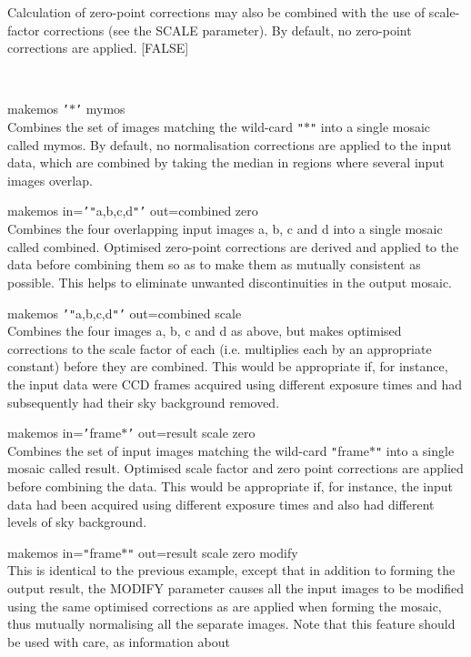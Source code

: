 \documentclass[twoside,11pt]{article}
\renewcommand{\_}{\texttt{\symbol{95}}}
\newcommand{\qt}[1]{{\tt "}#1{\tt "}}
\newcommand{\qs}[1]{{\tt '}#1{\tt '}}
\newcommand{\sstexamples}[1]{
   \item[Examples:] \mbox{} \\
   \vspace{-3.5ex}
   \begin{description}
      #1
   \end{description}
}
\newcommand{\sstexamplesubsection}[2]{\sloppy \item{\ssttt #1} \mbox{} \\ #2 }
\newcommand{\sstexamples}[1]{
      \item[Examples:] \\
      \begin{description}
         #1
      \end{description}
      \\
   }
\newcommand{\sstexamplesubsection}[2]{\item[{\ssttt #1}] #2}
\begin{document}
{{{         Calculation of zero-point corrections may also be combined
         with the use of scale-factor corrections (see the SCALE
         parameter). By default, no zero-point corrections are applied.
         [FALSE]
      }
   }
   \sstexamples{
      \sstexamplesubsection{
         makemos \qs{$*$} mymos
      } {
         Combines the set of images matching the wild-card \qt{$*$} into a
         single mosaic called mymos. By default, no normalisation
         corrections are applied to the input data, which are combined
         by taking the median in regions where several input images
         overlap.
      }
      \sstexamplesubsection{
         makemos in=\qs{\qt{a,b,c,d}} out=combined zero
      } {
         Combines the four overlapping input images a, b, c and d into a
         single mosaic called combined. Optimised zero-point
         corrections are derived and applied to the data before
         combining them so as to make them as mutually consistent as
         possible. This helps to eliminate unwanted discontinuities in
         the output mosaic.
      }
      \sstexamplesubsection{
         makemos \qs{\qt{a,b,c,d}} out=combined scale
      } {
         Combines the four images a, b, c and d as above, but makes
         optimised corrections to the scale factor of each (i.e.
         multiplies each by an appropriate constant) before they are
         combined. This would be appropriate if, for instance, the
         input data were CCD frames acquired using different exposure
         times and had subsequently had their sky background removed.
      }
      \sstexamplesubsection{
         makemos in=\qs{frame$*$} out=result scale zero
      } {
         Combines the set of input images matching the wild-card \qt{frame$*$}
         into a single mosaic called result. Optimised scale factor and
         zero point corrections are applied before combining the data.
         This would be appropriate if, for instance, the input data had
         been acquired using different exposure times and also had
         different levels of sky background.
      }
      \sstexamplesubsection{
         makemos in=\qt{frame$*$} out=result scale zero modify
      } {
         This is identical to the previous example, except that in
         addition to forming the output result, the MODIFY parameter
         causes all the input images to be modified using the same
         optimised corrections as are applied when forming the mosaic,
         thus mutually normalising all the separate images.  Note that
         this feature should be used with care, as information about
}}}
\end{document}
